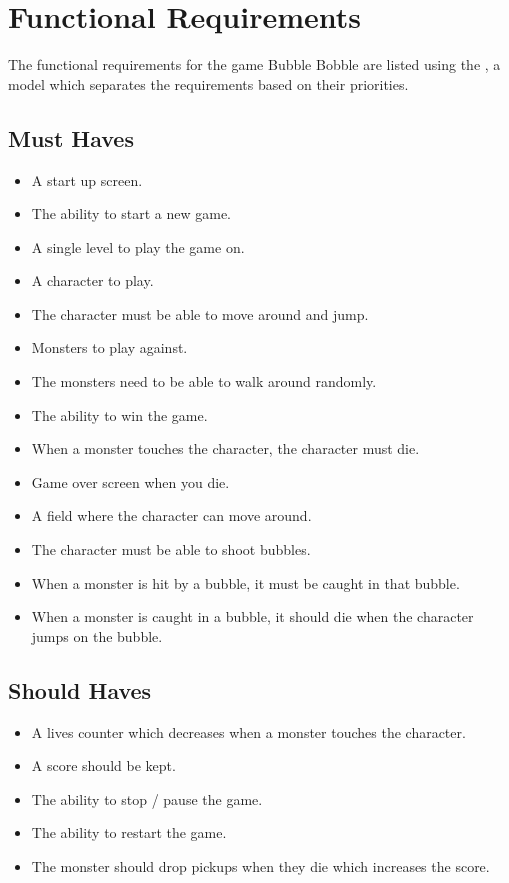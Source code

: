 \chapter{Functional Requirements}

The functional requirements for the game Bubble Bobble are listed using the , a model which separates the requirements based on their priorities.

\section{Must Haves}

\begin{itemize}
\itemsep0em 
 	\item A start up screen.
  	\item The ability to start a new game.
  	\item A single level to play the game on.
  	\item A character to play.
  	\item The character must be able to move around and jump.
  	\item Monsters to play against.
  	\item The monsters need to be able to walk around randomly.
 	\item The ability to win the game.
	\item When a monster touches the character, the character must die.
 	\item Game over screen when you die.
 	\item A field where the character can move around.
 	\item The character must be able to shoot bubbles.
 	\item When a monster is hit by a bubble, it must be caught in that bubble.
	\item When a monster is caught in a bubble, it should die when the character jumps on the bubble. 
\end{itemize}

\section{Should Haves}

\begin{itemize}
\itemsep0em 
 \item A lives counter which decreases when a monster touches the character. 
 \item A score should be kept. 
 \item The ability to stop / pause the game.
 \item The ability to restart the game.
 \item The monster should drop pickups when they die which increases the score.
\end{itemize}


